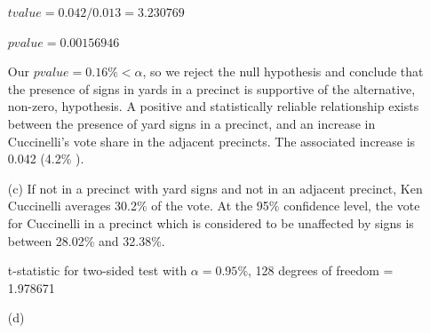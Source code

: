 \documentclass[12pt,letterpaper]{article}
\begin{document}
\begin{enumerate}

	$tvalue =  0.042/0.013 = 3.230769$
	
	$pvalue = 0.00156946$
	
  Our $pvalue = 0.16\% < \alpha$, so we reject the null hypothesis and conclude that the presence of signs in yards in a precinct is supportive  of the alternative, non-zero, hypothesis.  A positive and statistically reliable relationship exists between the presence of yard signs in a precinct, and an increase in Cuccinelli's vote share in the adjacent precincts.	 The associated increase is 0.042 (4.2\% ).
     

  
	\item [(c)] %
	If not in a precinct with yard signs and not in an adjacent precinct, Ken Cuccinelli averages 30.2\% of the vote.  	At the 95\% confidence level, the vote for Cuccinelli in a precinct which is considered  to be unaffected by signs is between  28.02\% and 32.38\%. 

  

    
  t-statistic for two-sided test with $\alpha = 0.95\%$, 128 degrees of freedom = 1.978671

	\item [(d)] %


\end{enumerate}
\end{document}
